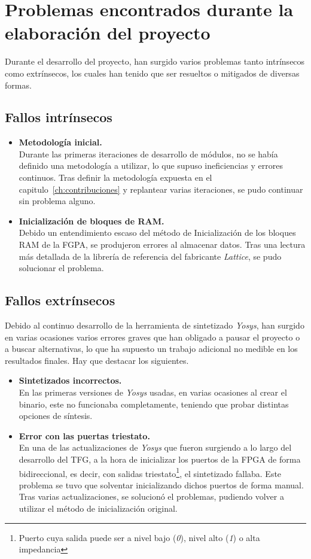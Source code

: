 \section{Problemas encontrados durante la elaboración del proyecto}
Durante el desarrollo del proyecto, han surgido varios problemas tanto intrínsecos como extrínsecos, los cuales han tenido que ser resueltos o mitigados de diversas formas. 

\subsection{Fallos intrínsecos}
\begin{itemize}
    \item \textbf{Metodología inicial.} \\
    Durante las primeras iteraciones de desarrollo de módulos, no se había definido una metodología a utilizar, lo que supuso ineficiencias y errores continuos. Tras definir la metodología expuesta en el capitulo~\ref{ch:contribuciones} y replantear varias iteraciones, se pudo continuar sin problema alguno.
    
    \item \textbf{Inicialización de bloques de RAM.} \\
    Debido un entendimiento escaso del método de Inicialización de los bloques RAM de la FGPA, se produjeron errores al almacenar datos. Tras una lectura más detallada de la librería de referencia\cite{lattice:ice-library} del fabricante \emph{Lattice}, se pudo solucionar el problema.
\end{itemize}

\subsection{Fallos extrínsecos}
Debido al continuo desarrollo de la herramienta de sintetizado \emph{Yosys}, han surgido en varias ocasiones varios errores graves que han obligado a pausar el proyecto o a buscar alternativas, lo que ha supuesto un trabajo adicional no medible en los resultados finales. Hay que destacar los siguientes.
\begin{itemize}
    \item \textbf{Sintetizados incorrectos.} \\
    En las primeras versiones de \emph{Yosys} usadas, en varias ocasiones al crear el binario, este no funcionaba completamente, teniendo que probar distintas opciones de síntesis.

    \item \textbf{Error con las puertas triestato.} \\
    En una de las actualizaciones de \emph{Yosys} que fueron surgiendo a lo largo del desarrollo del TFG, a la hora de inicializar los puertos de la FPGA de forma bidireccional, es decir, con salidas triestato\footnote{Puerto cuya salida puede ser a nivel bajo (\emph{0}), nivel alto (\emph{1}) o alta impedancia}, el sintetizado fallaba. Este problema se tuvo que solventar inicializando dichos puertos de forma manual. Tras varias actualizaciones, se solucionó el problemas, pudiendo volver a utilizar el método de inicialización original.
\end{itemize}


